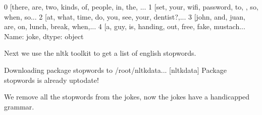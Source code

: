 \documentclass[letterpaper,10pt,english]{jupyterBook}
\begin{document}
\begin{sphinxVerbatim}[commandchars=\\\{\}]
0    [there, are, two, kinds, of, people, in, the, ...
1    [set, your, wifi, password, to, , so, when, so...
2    [at, what, time, do, you, see, your, dentist?,...
3    [john, and, juan, are, on, lunch, break, when,...
4    [a, guy, is, handing, out, free, fake, mustach...
Name: joke, dtype: object
\end{sphinxVerbatim}

\sphinxAtStartPar
Next we use the nltk toolkit to get a list of english stopwords.

\begin{sphinxVerbatim}[commandchars=\\\{\}]
 
   
\PYG{p}{[}\PYG{p}{]}
\end{sphinxVerbatim}

\begin{sphinxVerbatim} Downloading package stopwords to /root/nltk\PYGZus{}data...
[nltk\PYGZus{}data]   Package stopwords is already up\PYGZhy{}to\PYGZhy{}date!
\end{sphinxVerbatim}

\begin{sphinxVerbatim}
\end{sphinxVerbatim}

\sphinxAtStartPar
We remove all the stopwords from the jokes, now the jokes have a handicapped grammar.

\begin{sphinxVerbatim}[commandchars=\\\{\}]
     \PYG{p}{[}         \PYG{p}{]}
\end{sphinxVerbatim}
\end{document}

